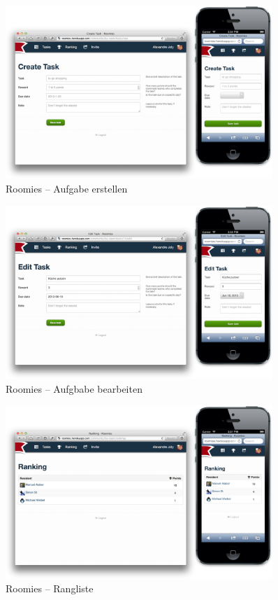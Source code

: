 \begin{figure}[H]
	\centering
	\includegraphics[width=0.9\textwidth]{content/appendix/roomies-screenshots/create_task.png}
	\caption{Roomies -- Aufgabe erstellen}
	\label{fig:roomies-ss-create-task}
\end{figure}

\begin{figure}[H]
	\centering
	\includegraphics[width=0.9\textwidth]{content/appendix/roomies-screenshots/edit_task.png}
	\caption{Roomies -- Aufgbabe bearbeiten}
	\label{fig:roomies-ss-edit-task}
\end{figure}

\begin{figure}[H]
	\centering
	\includegraphics[width=0.9\textwidth]{content/appendix/roomies-screenshots/ranking.png}
	\caption{Roomies -- Rangliste}
	\label{fig:roomies-ss-ranking}
\end{figure}

